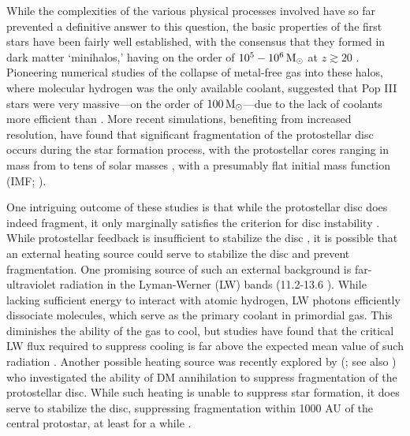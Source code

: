 \documentclass[../thesis.tex]{subfiles}
\begin{document}
While the complexities of the various physical processes involved have so far prevented a definitive answer to this question, the basic properties of the first stars have been fairly well established, with the consensus that they formed in dark matter `minihalos,' having on the order of $10^5 - 10^6 \,\mathrm{M}_{\odot}$ at $z\gtrsim 20$ \citep{CouchmanRees1986, HaimanThoulLoeb1996, Tegmarketal1997}.  Pioneering numerical studies of the collapse of metal-free gas into these halos, where molecular hydrogen was the only available coolant, suggested that Pop III stars were very massive---on the order of $100\,\mathrm{M}_{\odot}$---due to the lack of coolants more efficient than \htwo \citep[e.g.,][]{BrommCoppiLarson1999, BrommCoppiLarson2002, AbelBryanNorman2002, Yoshidaetal2003, BrommLarson2004, Yoshidaetal2006, OSheaNorman2007}.  More recent simulations, benefiting from increased resolution, have found that significant fragmentation of the protostellar disc occurs during the star formation process, with the protostellar cores ranging in mass from  to tens of solar masses \citep{StacyGreifBromm2010, Clarketal2011a, Clarketal2011b, Greifetal2011, Greifetal2012, StacyBromm2013, SusaHasegawaTominaga2014, Hiranoetal2014,Hiranoetal2015}, with a presumably flat initial mass function (IMF; \citealt{Dopckeetal2013}).

One intriguing outcome of these studies is that while the protostellar disc does indeed fragment, it only marginally satisfies the \citet{Gammie2001} criterion for disc instability \citep{Clarketal2011b, Greifetal2011, Greifetal2012}. While protostellar feedback is insufficient to stabilize the disc \citep{Smithetal2011, StacyGreifBromm2012}, it is possible that an external heating source could serve to stabilize the disc and prevent fragmentation. One promising source of such an external background is far-ultraviolet radiation in the Lyman-Werner (LW) bands (11.2-13.6 \ev).  While lacking sufficient energy to interact with atomic hydrogen, LW photons efficiently dissociate \htwo molecules, which serve as the primary coolant in primordial gas.  This diminishes the ability of the gas to cool, but studies have found that the critical LW flux required to suppress \htwo cooling is far above the expected mean value of such radiation \citep{Dijkstraetal2008}. Another possible heating source was recently explored by \citeauthor{Smithetal2012b}  (\citeyear{Smithetal2012b}; see also \citealt{Ripamontietal2009, Ripamontietal2010}) who investigated the ability of DM annihilation  to suppress fragmentation of the protostellar disc.  While such heating is unable to suppress star formation, it does serve to stabilize the disc, suppressing fragmentation within 1000 AU of the central protostar, at least for a while \citep{Stacyetal2012, Stacyetal2014}.
\end{document}
